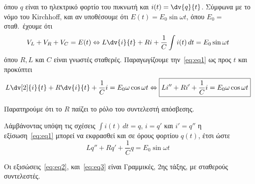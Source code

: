 \documentclass[a4paper,table]{report}
\begin{document}
όπου $ q $ είναι το ηλεκτρικό φορτίο του πυκνωτή και $ i(t) = \dv{q}{t} $.  
Σύμφωνα με το νόμο του Kirchhoff, και αν υποθέσουμε ότι $ E(t) = E_{0}
\sin{\omega t} $, όπου $ E_{0} = $ σταθ.\ έχουμε ότι 
\begin{equation}\label{eq:eq1}
  V_{L} + V_{R} + V_{C} = E(t) \Leftrightarrow L \dv{i}{t} + Ri + \frac{1}{C}
  \int i(t) \,{dt} = E_{0} \sin{\omega t}
\end{equation}
όπου $ R,L $ και $ C $ είναι γνωστές σταθερές.
Παραγωγίζουμε την~\eqref{eq:eq1} ως προς $t$ και προκύπτει
\begin{equation}\label{eq:eq2}
  L \dv[2]{i}{t} + R \dv{i}{t} + \frac{1}{C} i = E_{0} \omega \cos{\omega t} 
  \Leftrightarrow \boxed{L i'' + R i' + \frac{1}{C} i = E_{0} \omega \cos{\omega t}}
\end{equation} 
\begin{rem}
\item {}
  \begin{myitemize}
    \item Παρατηρούμε ότι το $R$ παίζει το ρόλο του συντελεστή απόσβεσης.
    \item Λάμβάνοντας υπόψη τις σχέσεις $ \int i(t) \,{dt} = q $, $ i= q' $ και 
      $ i' = q'' $ η εξίσωση~\eqref{eq:eq1} μπορεί να εκφρασθεί και σε 
      όρους φορτίου $ q(t) $, έτσι ώστε
      \begin{equation}\label{eq:eq3}
        \boxed{L q'' + Rq' + \frac{1}{C} q = E_{0} \sin{\omega t}}
      \end{equation}
  \end{myitemize}
\end{rem}

Οι εξισώσεις~\eqref{eq:eq2}, και~\eqref{eq:eq3} είναι Γραμμικές, 2ης τάξης, με σταθερούς
συντελεστές. 
 
\end{document}
